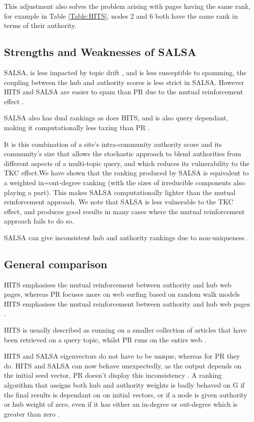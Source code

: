 \documentclass[11pt]{report}
\begin{document}
This adjustment also solves the problem arising with pages having the same rank, for example in Table \ref{Table:HITS}, nodes 2 and 6 both have the same rank in terms of their authority. 


\subsection{Strengths and Weaknesses of SALSA} \label{sec:SALSA adv and dis}
SALSA, is less impacted by topic drift \cite{lempel2000stochastic}, and is less susceptible to spamming, the coupling between the hub and authority scores is less strict in SALSA. However HITS and SALSA are easier to spam than PR due to the mutual reinforcement effect \cite{langville}. 

SALSA also has dual rankings as does HITS, and is also query dependant, making it computationally less taxing than PR \cite{langville}.


It is this combination of a site’s intra-community authority score and its community’s size that allows the stochastic approach to blend authorities from different aspects of a multi-topic query, and which reduces its vulnerability to the TKC effect.We have shown that the ranking produced by SALSA is equivalent to a weighted in=out-degree ranking (with the sizes of irreducible components also playing a part). This makes SALSA computationally lighter than the mutual reinforcement approach. We note that SALSA is less vulnerable to the TKC effect, and produces good results in many cases where the mutual reinforcement approach fails to do so.\cite{lempel2000stochastic}

SALSA can give inconsistent hub and authority rankings due to non-uniqueness \cite{farahat2006authority}.

\subsection{General comparison}
 HITS emphasises the mutual reinforcement between authority and hub web pages, whereas PR focuses more on web surfing based on random walk models HITS emphasises the mutual reinforcement between authority and hub web pages \cite{ding2003pagerank}.

HITS is usually described as running on a smaller collection of articles that have been retrieved on a query topic, whilst PR runs on the entire web \cite{ng2001link}.

HITS and SALSA eigenvectors do not have to be unique, whereas for PR they do. HITS and SALSA can now behave unexpectedly, as the output depends on the initial seed vector, PR doesn't display this inconsistency \cite{farahat2006authority}. A ranking algorithm that assigns both hub and authority weights is badly behaved on G if the final results is dependant on on initial vectors, or if a node is given authority or hub weight of zero, even if it has either an in-degree or out-degree which is greater than zero \cite{bonato}. %
\end{document}
